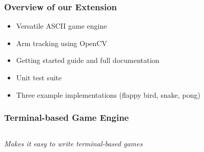 \documentclass{beamer}
\begin{document}
\begin{frame}
	\frametitle{Overview of our Extension}
	\begin{itemize}
		\item Versatile ASCII game engine
		\item Arm tracking using OpenCV
		\item Getting started guide and full documentation
		\item Unit test suite
		\item Three example implementations (flappy bird, snake, pong)
	\end{itemize}
\end{frame}

\begin{frame}
	\frametitle{Terminal-based Game Engine}
	\begin{columns}
		\begin{column}{0.625\textwidth}
			\emph{Makes it easy to write terminal-based games}
			

\end{column}
\end{columns}
\end{frame}
\end{document}
